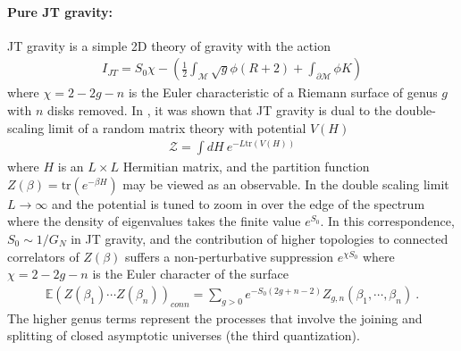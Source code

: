 \documentclass[a4paper,11pt]{article}
\theoremstyle{definition}
\numberwithin{equation}{section}
\begin{document}
\paragraph{Pure JT gravity:}
JT gravity is a simple 2D theory of gravity with the action
\begin{eqnarray}\label{JTaction}
    I_{JT}=S_0\chi-\left(\frac{1}{2}\int_\mathcal{M}\sqrt{g}\phi(R+2)+\int_{\partial\mathcal{M}}\phi K\right)
\end{eqnarray}
where $\chi=2-2g-n$ is the Euler characteristic of a Riemann surface of genus $g$ with $n$ disks removed.
In \cite{saad2019jt}, it was shown that JT gravity is dual to the double-scaling limit of a random matrix theory with potential $V(H)$
\begin{eqnarray}
    \mathcal{Z}=\int dH\:e^{-L\text{tr}(V(H))}
\end{eqnarray}
where $H$ is an $L\times L$ Hermitian matrix, and the partition function $Z(\beta)=\text{tr}(e^{-\beta H})$ may be viewed as an observable. In the double scaling limit $L\to \infty$ and the potential is tuned to zoom in over the edge of the spectrum where the density of eigenvalues takes the finite value $e^{S_0}$. In this correspondence, $S_0\sim 1/G_N$ in JT gravity, and the contribution of higher topologies to connected correlators of $Z(\beta)$ suffers a non-perturbative suppression  $e^{\chi S_0}$ where $\chi=2-2g-n$ is the Euler character of the surface
\begin{eqnarray}\label{Conneccor}
    \mathbb{E}(Z(\beta_1)\cdots Z(\beta_n))_{conn}=\sum_{g>0}e^{-S_0(2g+n-2)}Z_{g,n}(\beta_1,\cdots ,\beta_n)\ .
\end{eqnarray}
The higher genus terms represent the processes that involve the joining and splitting of closed asymptotic universes (the third quantization).
\end{document}
